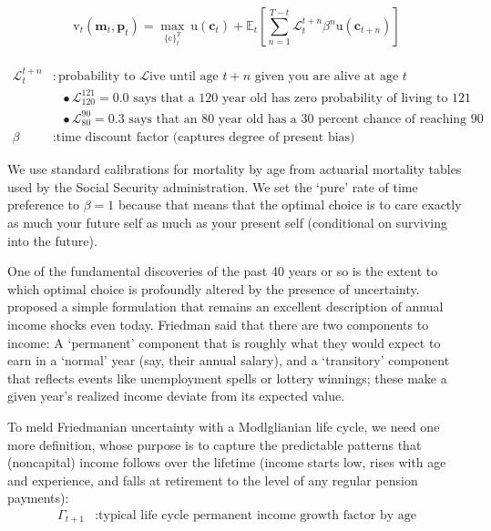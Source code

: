 \documentclass{article}
\newcommand{\uFunc}{\mathrm{u}}
\newcommand{\pLvl}{\mathbf{p}}
\newcommand{\mLvl}{\mathbf{m}}
\newcommand{\DiscFac}{\beta}
\newcommand{\cFunc}{\mathrm{c}}
\newcommand{\vFunc}{\mathrm{v}}
\newcommand{\Alive}{\mathcal{L}}
\newcommand{\cLvl}{\mathbf{c}}
\newcommand{\Ex}{\mathbb{E}}
\newcommand{\permGroFac}{\Gamma}
\begin{document}
\begin{equation}
\label{eq:lifecyclemax}
\pmb{\vFunc}_{t}(\mLvl_{t},\pLvl_{t}) = \max_{\{\cFunc\}_{t}^{T}} ~ \uFunc(\cLvl_{t})+\Ex_{t}\left[\sum_{n=1}^{T-t} \Alive_{t}^{t+n}{\DiscFac}^{n} \uFunc(\cLvl_{t+n}) \right]
\end{equation}

\begin{align}
    \\ \Alive _{t}^{t+n} & : \text{probability to }\Alive\text{ive until age $t+n$ given you are alive at age $t$}
    \\                   & {~~~}\bullet \text{$\Alive_{120}^{121} = 0.0$ says that a 120 year old has zero probability of living to 121}
    \\                   & {~~~}\bullet \text{$\Alive_{80}^{90} = 0.3$ says that an 80 year old has a 30 percent chance of reaching 90}
    \\ {\DiscFac}        & : \text{time discount factor (captures degree of present bias)}
\end{align}

We use standard calibrations for mortality by age from actuarial mortality tables used by the Social Security administration. We set the `pure' rate of time preference to $\beta=1$ because that means that the optimal choice is to care exactly as much your future self as much as your present self (conditional on surviving into the future).

One of the fundamental discoveries of the past 40 years or so is the extent to which optimal choice is profoundly altered by the presence of uncertainty. \cite{friedman1957} proposed a simple formulation that remains an excellent description of annual income shocks even today. Friedman said that there are two components to income: A `permanent' component that is roughly what they would expect to earn in a `normal' year (say, their annual salary), and a `transitory' component that reflects events like unemployment spells or lottery winnings; these make a given year's realized income deviate from its expected value.

To meld Friedmanian uncertainty with a Modlglianian life cycle, we need one more definition, whose purpose is to capture the predictable patterns that (noncapital) income follows over the lifetime (income starts low, rises with age and experience, and falls at retirement to the level of any regular pension payments):
\begin{align}
    \permGroFac_{t+1} & : \text{typical life cycle permanent income growth factor by age}
\end{align}
\end{document}

